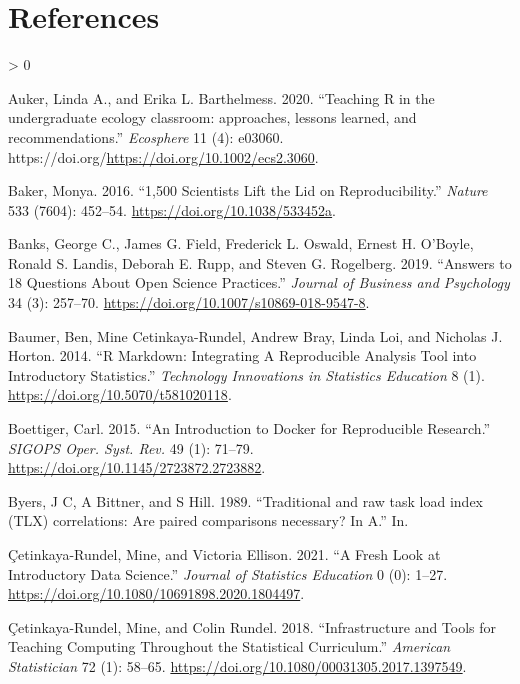 \documentclass[
]{article}
\newlength{\cslhangindent}
\newenvironment{CSLReferences}[2] %
 {%
  \setlength{\parindent}{0pt}
  \ifodd #1 \everypar{\setlength{\hangindent}{\cslhangindent}}\ignorespaces\fi
  \ifnum #2 > 0
  \setlength{\parskip}{#2\baselineskip}
  \fi
 }%
 {}
\begin{document}
\hypertarget{references}{%
\section*{References}\label{references}}

\hypertarget{refs}{}
\begin{CSLReferences}{1}{0}
\leavevmode\hypertarget{ref-Auker2020}{}%
Auker, Linda A., and Erika L. Barthelmess. 2020. {``{Teaching R in the
undergraduate ecology classroom: approaches, lessons learned, and
recommendations}.''} \emph{Ecosphere} 11 (4): e03060.
https://doi.org/\url{https://doi.org/10.1002/ecs2.3060}.

\leavevmode\hypertarget{ref-Baker2016}{}%
Baker, Monya. 2016. {``1,500 Scientists Lift the Lid on
Reproducibility.''} \emph{Nature} 533 (7604): 452--54.
\url{https://doi.org/10.1038/533452a}.

\leavevmode\hypertarget{ref-Banks2019}{}%
Banks, George C., James G. Field, Frederick L. Oswald, Ernest H.
O'Boyle, Ronald S. Landis, Deborah E. Rupp, and Steven G. Rogelberg.
2019. {``{Answers to 18 Questions About Open Science Practices}.''}
\emph{Journal of Business and Psychology} 34 (3): 257--70.
\url{https://doi.org/10.1007/s10869-018-9547-8}.

\leavevmode\hypertarget{ref-Baumer2014}{}%
Baumer, Ben, Mine Cetinkaya-Rundel, Andrew Bray, Linda Loi, and Nicholas
J. Horton. 2014. {``{R Markdown: Integrating A Reproducible Analysis
Tool into Introductory Statistics}.''} \emph{Technology Innovations in
Statistics Education} 8 (1). \url{https://doi.org/10.5070/t581020118}.

\leavevmode\hypertarget{ref-Boettiger2015}{}%
Boettiger, Carl. 2015. {``{An Introduction to Docker for Reproducible
Research}.''} \emph{SIGOPS Oper. Syst. Rev.} 49 (1): 71--79.
\url{https://doi.org/10.1145/2723872.2723882}.

\leavevmode\hypertarget{ref-Byers1989}{}%
Byers, J C, A Bittner, and S Hill. 1989. {``{Traditional and raw task
load index (TLX) correlations: Are paired comparisons necessary? In
A}.''} In.

\leavevmode\hypertarget{ref-Cetinkaya-Rundel2021}{}%
Çetinkaya-Rundel, Mine, and Victoria Ellison. 2021. {``{A Fresh Look at
Introductory Data Science}.''} \emph{Journal of Statistics Education} 0
(0): 1--27. \url{https://doi.org/10.1080/10691898.2020.1804497}.

\leavevmode\hypertarget{ref-Cetinkaya-Rundel2018}{}%
Çetinkaya-Rundel, Mine, and Colin Rundel. 2018. {``{Infrastructure and
Tools for Teaching Computing Throughout the Statistical Curriculum}.''}
\emph{American Statistician} 72 (1): 58--65.
\url{https://doi.org/10.1080/00031305.2017.1397549}.


\end{CSLReferences}
\end{document}
